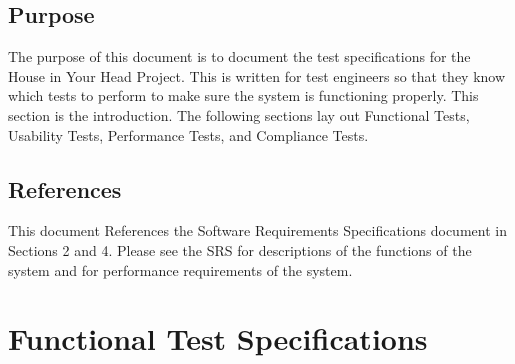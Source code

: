 \documentclass{article}
\begin{document}
\subsection{Purpose}

The purpose of this document is to document the test specifications for the House in Your Head Project. This is written for test engineers so that they know which tests to perform to make sure the system is functioning properly. This section is the introduction. The following sections lay out Functional Tests, Usability Tests, Performance Tests, and Compliance Tests.

\subsection{References}


This document References the Software Requirements Specifications document in Sections 2 and 4. Please see the SRS for descriptions of the functions of the system and for performance requirements of the system.

\newpage

\section{Functional Test Specifications}

\end{document}
